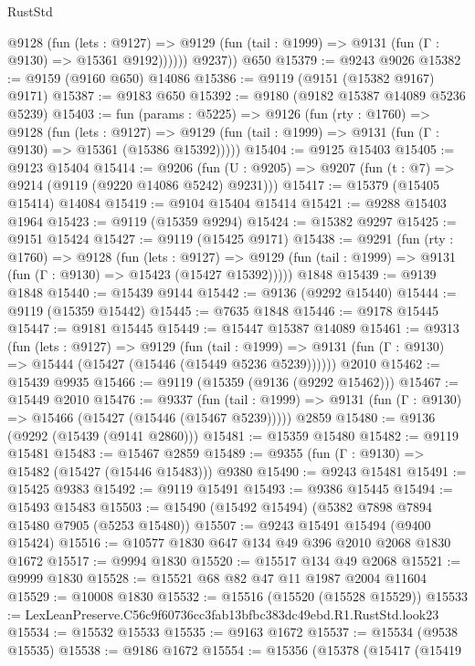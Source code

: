 \begin{lexlean}{RustStd}
\begin{coremodule}
            @9128
              (fun (lets : @9127) =>
              @9129 (fun (tail : @1999) => @9131 (fun (Γ : @9130) => @15361 @9192))))))
        @9237))
    @650
@15379 := @9243 @9026
@15382 := @9159 (@9160 @650) @14086
@15386 := @9119 (@9151 (@15382 @9167) @9171)
@15387 := @9183 @650
@15392 := @9180 (@9182 @15387 @14089 @5236 @5239)
@15403 := fun (params : @5225) =>
  @9126
    (fun (rty : @1760) =>
    @9128
      (fun (lets : @9127) =>
      @9129 (fun (tail : @1999) => @9131 (fun (Γ : @9130) => @15361 (@15386 @15392)))))
@15404 := @9125 @15403
@15405 := @9123 @15404
@15414 := @9206
    (fun (U : @9205) => @9207 (fun (t : @7) => @9214 (@9119 (@9220 @14086 @5242) @9231)))
@15417 := @15379 (@15405 @15414) @14084
@15419 := @9104 @15404 @15414
@15421 := @9288 @15403 @1964
@15423 := @9119 (@15359 @9294)
@15424 := @15382 @9297
@15425 := @9151 @15424
@15427 := @9119 (@15425 @9171)
@15438 := @9291
    (fun (rty : @1760) =>
    @9128
      (fun (lets : @9127) =>
      @9129 (fun (tail : @1999) => @9131 (fun (Γ : @9130) => @15423 (@15427 @15392)))))
    @1848
@15439 := @9139 @1848
@15440 := @15439 @9144
@15442 := @9136 (@9292 @15440)
@15444 := @9119 (@15359 @15442)
@15445 := @7635 @1848
@15446 := @9178 @15445
@15447 := @9181 @15445
@15449 := @15447 @15387 @14089
@15461 := @9313
    (fun (lets : @9127) =>
    @9129
      (fun (tail : @1999) =>
      @9131 (fun (Γ : @9130) => @15444 (@15427 (@15446 (@15449 @5236 @5239))))))
    @2010
@15462 := @15439 @9935
@15466 := @9119 (@15359 (@9136 (@9292 @15462)))
@15467 := @15449 @2010
@15476 := @9337
    (fun (tail : @1999) => @9131 (fun (Γ : @9130) => @15466 (@15427 (@15446 (@15467 @5239)))))
    @2859
@15480 := @9136 (@9292 (@15439 (@9141 @2860)))
@15481 := @15359 @15480
@15482 := @9119 @15481
@15483 := @15467 @2859
@15489 := @9355 (fun (Γ : @9130) => @15482 (@15427 (@15446 @15483))) @9380
@15490 := @9243 @15481
@15491 := @15425 @9383
@15492 := @9119 @15491
@15493 := @9386 @15445
@15494 := @15493 @15483
@15503 := @15490 (@15492 @15494) (@5382 @7898 @7894 @15480 @7905 (@5253 @15480))
@15507 := @9243 @15491 @15494 (@9400 @15424)
@15516 := @10577 @1830 @647 @134 @49 @396 @2010 @2068 @1830 @1672
@15517 := @9994 @1830
@15520 := @15517 @134 @49 @2068
@15521 := @9999 @1830
@15528 := @15521 @68 @82 @47 @11 @1987 @2004 @11604
@15529 := @10008 @1830
@15532 := @15516 (@15520 (@15528 @15529))
@15533 := LexLeanPreserve.C56c9f60736cc3fab13bfbc383dc49ebd.R1.RustStd.look23
@15534 := @15532 @15533
@15535 := @9163 @1672
@15537 := @15534 (@9538 @15535)
@15538 := @9186 @1672
@15554 := @15356
    (@15378
      (@15417
        (@15419

\end{coremodule}
\end{lexlean}
